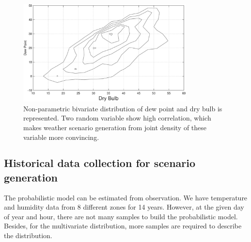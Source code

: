 \documentclass[journal]{IEEEtran} %
\begin{document}
  
  
  





\begin{figure}[t!]
\centering
  \includegraphics[width=3.5in]{Contour}
\caption{Non-parametric bivariate distribution of dew point and dry bulb is represented. Two random variable show high correlation, which makes  weather scenario generation from joint density of these variable more convincing.}
\label{Dependency}       %
\end{figure}












\subsection{Historical data collection for scenario generation}
The probabilistic model can be estimated from observation. We have temperature and humidity data from 8 different zones for 14 years. However, at the given day of year and hour, there are not many samples to build the probabilistic model. Besides, for the multivariate distribution, more samples are required to describe the distribution. 
\end{document}

